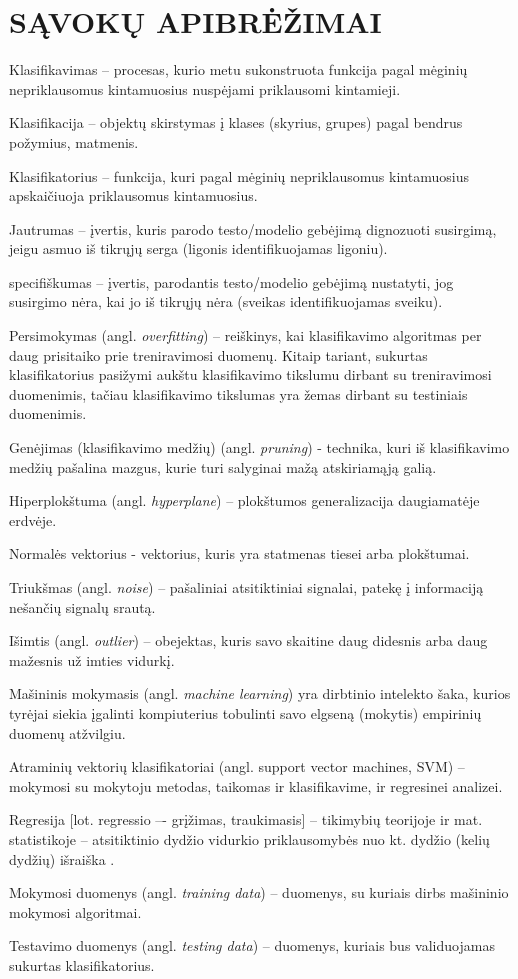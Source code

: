 \section*{SĄVOKŲ APIBRĖŽIMAI}

Klasifikavimas -- procesas, kurio metu sukonstruota funkcija pagal mėginių nepriklausomus kintamuosius nuspėjami priklausomi kintamieji.

Klasifikacija -- objektų skirstymas į klases (skyrius, grupes) pagal bendrus požymius, matmenis.

Klasifikatorius -- funkcija, kuri pagal mėginių nepriklausomus kintamuosius apskaičiuoja priklausomus kintamuosius.

Jautrumas -- įvertis, kuris parodo testo/modelio gebėjimą dignozuoti susirgimą, jeigu asmuo iš tikrųjų serga (ligonis identifikuojamas ligoniu).

specifiškumas -- įvertis, parodantis testo/modelio gebėjimą nustatyti, jog susirgimo nėra, kai jo iš tikrųjų nėra (sveikas identifikuojamas sveiku).

Persimokymas (angl. \textit{overfitting}) -- reiškinys, kai klasifikavimo algoritmas per daug prisitaiko prie treniravimosi duomenų. Kitaip tariant, sukurtas klasifikatorius pasižymi aukštu klasifikavimo tikslumu dirbant su treniravimosi duomenimis, tačiau klasifikavimo tikslumas yra žemas dirbant su testiniais duomenimis.

Genėjimas (klasifikavimo medžių)  (angl. \textit{pruning}) - technika, kuri iš klasifikavimo medžių pašalina mazgus, kurie turi salyginai mažą atskiriamąją galią.

Hiperplokštuma (angl. \textit{hyperplane}) -- plokštumos generalizacija daugiamatėje erdvėje.

Normalės vektorius - vektorius, kuris yra statmenas tiesei arba plokštumai.

Triukšmas (angl. \textit{noise}) -- pašaliniai atsitiktiniai signalai, patekę į informaciją nešančių signalų srautą.

Išimtis (angl. \textit{outlier}) -- obejektas, kuris savo skaitine daug didesnis arba daug mažesnis už imties vidurkį.

Mašininis mokymasis (angl. \textit{machine learning}) yra dirbtinio intelekto šaka, kurios tyrėjai siekia įgalinti kompiuterius tobulinti savo elgseną (mokytis) empirinių duomenų atžvilgiu.

Atraminių vektorių klasifikatoriai (angl. support vector machines, SVM) -- mokymosi su mokytoju metodas, taikomas ir klasifikavime, ir regresinei analizei.

Regresija [lot. regressio –- grįžimas, traukimasis] -- tikimybių teorijoje ir mat. statistikoje – atsitiktinio dydžio vidurkio priklausomybės nuo kt. dydžio (kelių dydžių) išraiška \cite{tzz2010}.

Mokymosi duomenys (angl. \textit{training data}) -- duomenys, su kuriais dirbs mašininio mokymosi algoritmai.

Testavimo duomenys (angl. \textit{testing data}) -- duomenys, kuriais bus validuojamas sukurtas klasifikatorius.
